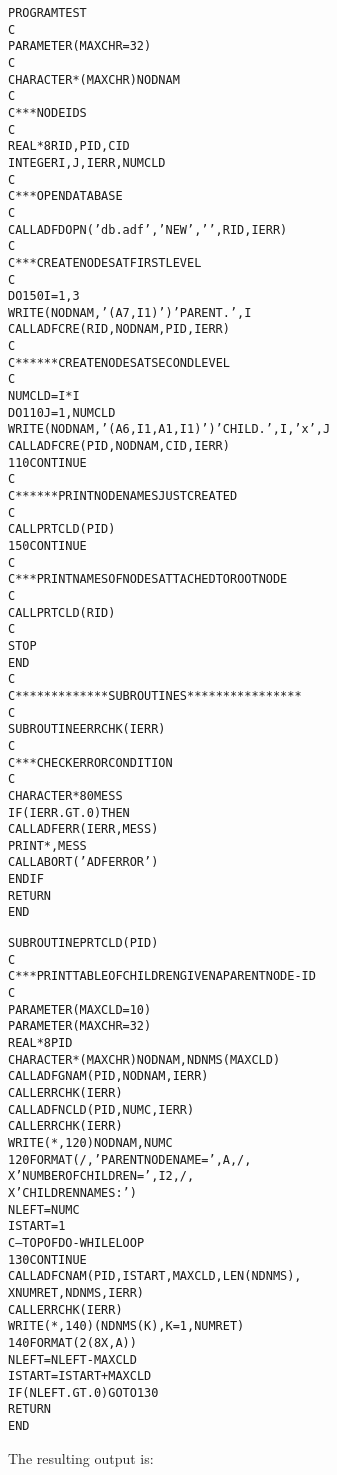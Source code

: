 \begin{alltt}
   PROGRAM TEST
   C
         PARAMETER (MAXCHR=32)
   C
         CHARACTER*(MAXCHR) NODNAM
   C
   C *** NODE IDS
   C
         REAL*8 RID,PID,CID
         INTEGER I,J,IERR,NUMCLD
   C
   C *** OPEN DATABASE
   C
         CALL ADFDOPN('db.adf','NEW',' ',RID,IERR)
   C
   C *** CREATE NODES AT FIRST LEVEL
   C
         DO 150 I = 1,3
            WRITE(NODNAM,'(A7,I1)')'PARENT.',I
            CALL ADFCRE(RID,NODNAM,PID,IERR)
   C
   C ****** CREATE NODES AT SECOND LEVEL
   C
            NUMCLD = I*I
            DO 110 J = 1,NUMCLD
               WRITE(NODNAM,'(A6,I1,A1,I1)')'CHILD.',I,'x',J
               CALL ADFCRE(PID,NODNAM,CID,IERR)
     110    CONTINUE
   C
   C ****** PRINT NODE NAMES JUST CREATED
   C
            CALL PRTCLD(PID)
     150 CONTINUE
   C
   C *** PRINT NAMES OF NODES ATTACHED TO ROOT NODE
   C
         CALL PRTCLD(RID)
   C
         STOP
         END
   C
   C ************* SUBROUTINES ****************
   C
         SUBROUTINE ERRCHK(IERR)
   C
   C *** CHECK ERROR CONDITION
   C
         CHARACTER*80 MESS
         IF (IERR .GT. 0) THEN
            CALL ADFERR(IERR,MESS)
            PRINT *,MESS
            CALL ABORT('ADF ERROR')
         ENDIF
         RETURN
         END

         SUBROUTINE PRTCLD(PID)
   C
   C *** PRINT TABLE OF CHILDREN GIVEN A PARENT NODE-ID
   C
         PARAMETER (MAXCLD=10)
         PARAMETER (MAXCHR=32)
         REAL*8 PID
         CHARACTER*(MAXCHR) NODNAM,NDNMS(MAXCLD)
         CALL ADFGNAM(PID,NODNAM,IERR)
         CALL ERRCHK(IERR)
         CALL ADFNCLD(PID,NUMC,IERR)
         CALL ERRCHK(IERR)
         WRITE(*,120)NODNAM,NUMC
     120 FORMAT(/,' PARENT NODE NAME = ',A,/,
        X       '     NUMBER OF CHILDREN = ',I2,/,
        X       '     CHILDREN NAMES: ')
         NLEFT = NUMC
         ISTART = 1
   C     --- TOP OF DO-WHILE LOOP
     130 CONTINUE
            CALL ADFCNAM(PID,ISTART,MAXCLD,LEN(NDNMS),
        X                NUMRET,NDNMS,IERR)
            CALL ERRCHK(IERR)
            WRITE(*,140)(NDNMS(K),K=1,NUMRET)
     140    FORMAT(2(8X,A))
            NLEFT = NLEFT - MAXCLD
            ISTART = ISTART + MAXCLD
         IF (NLEFT .GT. 0) GO TO 130
         RETURN
         END
\end{alltt}

\noindent
The resulting output is:

